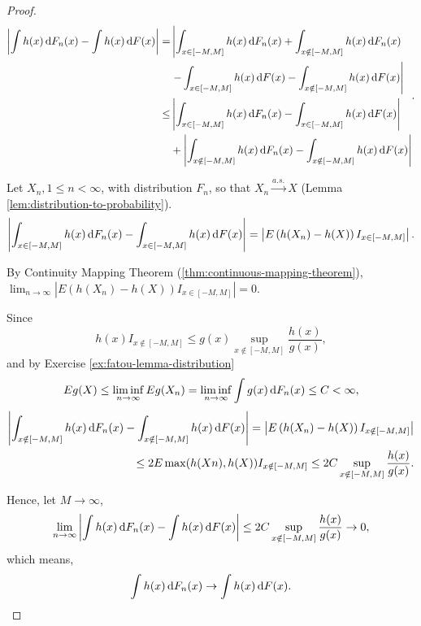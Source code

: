 \begin{proof}
	\begin{equation*}
		\begin{aligned}
			\left|\int h(x)\dif F_{n}(x)-\int h(x)\dif F(x)\right| = & \left|{\int_{x\in[-M,M]}h(x)\dif F_{n}(x)+\int_{x\notin[-M,M]}h(x)\dif F_{n}(x)}\right. \\
			                                                         & \left.{-\int_{x\in[-M,M]}h(x)\dif F(x)-\int_{x\notin[-M,M]}h(x)\dif F(x)}\right|        \\
			\leq                                                     & \left|\int_{x\in[-M,M]}h(x)\dif F_{n}(x)-\int_{x\in[-M,M]}h(x)\dif F(x)\right|          \\
			                                                         & + \left|\int_{x\notin[-M,M]}h(x)\dif F_{n}(x)-\int_{x\notin[-M,M]}h(x)\dif F(x)\right|
		\end{aligned}.
	\end{equation*}

	Let $X_n,1\leq n<\infty$, with distribution $F_n$, so that $X_n\stackrel{a.s.}{\rightarrow}X$ (Lemma \ref{lem:distribution-to-probability}).
	\begin{equation*}
		\left|\int_{x\in[-M,M]}h(x)\mathop{}\!\mathrm{d} F_{n}(x)-\int_{x\in[-M,M]}h(x)\mathop{}\!\mathrm{d} F(x)\right| = \left|E\left(h(X_n)-h(X)\right)I_{x\in[-M,M]}\right|.
	\end{equation*}

	By Continuity Mapping Theorem (\ref{thm:continuous-mapping-theorem}), $\lim_{n\rightarrow\infty}\left|E\left(h(X_n)-h(X)\right)I_{x\in[-M,M]}\right| = 0$.

	Since
	\begin{equation*}
		h(x)I_{x\notin[-M,M]}\leq g(x)\sup_{x\notin[-M,M]}\frac{h(x)}{g(x)},
	\end{equation*}
	and by Exercise \ref{ex:fatou-lemma-distribution}
	\begin{equation*}
		Eg(X) \leq \liminf_{n\rightarrow\infty}Eg(X_n)=\liminf_{n\rightarrow\infty}\int g(x)\mathop{}\!\mathrm{d} F_{n}(x)\leq C<\infty,
	\end{equation*}
	\begin{equation*}
		\begin{aligned}
			\left|\int_{x\notin[-M,M]}h(x)\mathop{}\!\mathrm{d} F_{n}(x)-\int_{x\notin[-M,M]}h(x)\mathop{}\!\mathrm{d} F(x)\right| = \left|E\left(h(X_n)-h(X)\right)I_{x\notin[-M,M]}\right| \\
			\leq 2E\max(h(Xn),h(X))I_{x\notin[-M,M]}\leq 2C\sup_{x\notin[-M,M]}\frac{h(x)}{g(x)}.                                                          \\
		\end{aligned}
	\end{equation*}

	Hence, let $M\rightarrow\infty$,
	\begin{equation*}
		\lim_{n\rightarrow\infty}\left|\int h(x)\mathop{}\!\mathrm{d} F_{n}(x)-\int h(x)\mathop{}\!\mathrm{d} F(x)\right| \leq 2C\sup_{x\notin[-M,M]}\frac{h(x)}{g(x)}\rightarrow 0,
	\end{equation*}
	which means,
	\begin{equation*}
		\int h(x)\mathop{}\!\mathrm{d} F_{n}(x) \rightarrow \int h(x)\mathop{}\!\mathrm{d} F(x).
	\end{equation*}
\end{proof}

